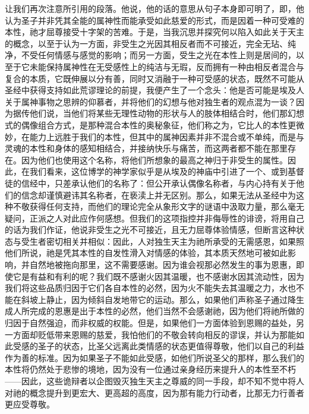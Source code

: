 让我们再次注意所引用的段落。他说，他的话的意思从句子本身即可明了，即，他认为圣子并非凭其全能的属神性而能承受如此慈爱的形式，而是因着一种可受难的本性，祂才屈尊接受十字架的苦难。于是，当我沉思并探究何以陷入如此关于天主的概念，以至于认为一方面，非受生之光因其相反者而不可接近，完全无玷、纯净，不受任何情感与感觉的影响；而另一方面，受生之光在本性上则是居间的，以至于它未能保持属神性在无受感性上的纯洁与无瑕，反而拥有一种由相反者混合与复合的本质，它既伸展以分有善，同时又消融于一种可受感的状态，既然不可能从圣经中获得支持如此荒谬理论的前提，我便产生了一个念头：他是否可能是埃及人关于属神事物之思辨的仰慕者，并将他们的幻想与他对独生者的观点混为一谈？因为据传他们说，当他们将某些无理性动物的形状与人的肢体相结合时，他们那幻想式的偶像组合方式，是那种混合本性的奥秘象征，他们称之为，它比人的本性更微妙，在能力上远胜于我们的本性，但其中的属神因素并非不混合或不单纯，而是与灵魂的本性和身体的感知相结合，并接纳快乐与痛苦，而这两者都不能在那里存在。因为他们也使用这个名称，将他们所想象的最高之神归于非受生的属性。因此，在我们看来，这位博学的神学家似乎是从埃及的神庙中引进了一个、或到基督徒的信经中，只差承认他们的名称了：但公开承认偶像名称者，与内心持有关于他们的信念却谨慎避讳其名称者，在亵渎上并无区别。那么，如果无法从圣经中为这种不敬获得任何支持，而他们的理论完全从象形文字的谜语中汲取力量，那么毫无疑问，正派之人对此应作何感想。但我们的这项指控并非侮辱性的诽谤，将用自己的话为我们作证，他说非受生之光不可接近，且无力屈尊体验情感，但断言这种状态与受生者密切相关并相似：因此，人对独生天主为祂所承受的无需感恩，如果照他们所说，祂是凭其本性的自发性滑入对情感的体验，其本质天然地可被如此影响，并自然地被拖向那里，这不需要感谢。因为谁会视那必然发生的事为恩惠，即使它是有益和有利的呢？我们既不感谢火因其温暖，也不感谢水因其流动性，因为我们将这些品质归因于它们各自本性的必然，因为火不能失去其温暖之力，水也不能在斜坡上静止，因为倾斜自发地带它的运动。那么，如果他们声称圣子通过降生成人所完成的恩惠是出于本性的必然，他们当然不会感谢祂，因为他们将祂所做的归因于自然强迫，而非权威的权能。但是，如果他们一方面体验到恩赐的益处，另一方面却贬低带来恩赐的慈爱，我怕他们的不敬会转向相反的谬误，并认为那能如此受感的圣子的状态，比圣父远离此类情感的状态更值得尊敬，他们以自己的利益作为善的标准。因为如果圣子不能如此受感，如他们所说圣父的那样，那么我们的本性将仍然处于悲惨的境地，因为没有一位通过亲身经历来提升人的本性至不朽——因此，这些诡辩者以企图毁灭独生天主之尊威的同一手段，却不知不觉中将人对祂的概念提升到更宏大、更高超的高度，因为那有能力行动者，比那无力行善者更应受尊敬。\par

